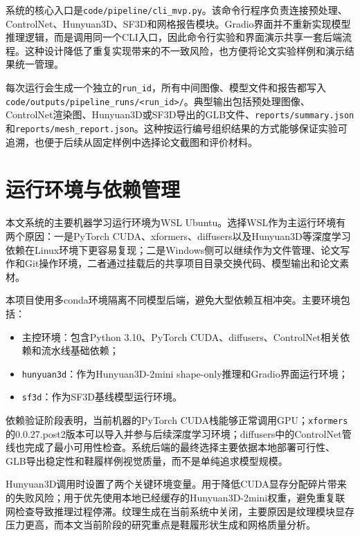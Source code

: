 系统的核心入口是\texttt{code/pipeline/cli\_mvp.py}。该命令行程序负责连接预处理、ControlNet、Hunyuan3D、SF3D和网格报告模块。Gradio界面并不重新实现模型推理逻辑，而是调用同一个CLI入口，因此命令行实验和界面演示共享一套后端流程。这种设计降低了重复实现带来的不一致风险，也方便将论文实验样例和演示结果统一管理。

每次运行会生成一个独立的\texttt{run\_id}，所有中间图像、模型文件和报告都写入\texttt{code/outputs/pipeline\_runs/<run\_id>/}。典型输出包括预处理图像、ControlNet渲染图、Hunyuan3D或SF3D导出的GLB文件、\texttt{reports/summary.json}和\texttt{reports/mesh\_report.json}。这种按运行编号组织结果的方式能够保证实验可追溯，也便于后续从固定样例中选择论文截图和评价材料。

\section{运行环境与依赖管理}

本文系统的主要机器学习运行环境为WSL Ubuntu。选择WSL作为主运行环境有两个原因：一是PyTorch CUDA、xformers、diffusers以及Hunyuan3D等深度学习依赖在Linux环境下更容易复现；二是Windows侧可以继续作为文件管理、论文写作和Git操作环境，二者通过挂载后的共享项目目录交换代码、模型输出和论文素材。

本项目使用多conda环境隔离不同模型后端，避免大型依赖互相冲突。主要环境包括：

\begin{itemize}
  \item 主控环境：包含Python 3.10、PyTorch CUDA、diffusers、ControlNet相关依赖和流水线基础依赖；
  \item \texttt{hunyuan3d}：作为Hunyuan3D-2mini shape-only推理和Gradio界面运行环境；
  \item \texttt{sf3d}：作为SF3D基线模型运行环境。
\end{itemize}

依赖验证阶段表明，当前机器的PyTorch CUDA栈能够正常调用GPU；\texttt{xformers}的0.0.27.post2版本可以导入并参与后续深度学习环境；diffusers中的ControlNet管线也完成了最小可用性检查。系统后端的最终选择主要依据本地部署可行性、GLB导出稳定性和鞋履样例视觉质量，而不是单纯追求模型规模。

Hunyuan3D调用时设置了两个关键环境变量。用于降低CUDA显存分配碎片带来的失败风险；用于优先使用本地已经缓存的Hunyuan3D-2mini权重，避免重复联网检查导致推理过程停滞。纹理生成在当前系统中关闭，主要原因是纹理模块显存压力更高，而本文当前阶段的研究重点是鞋履形状生成和网格质量分析。

